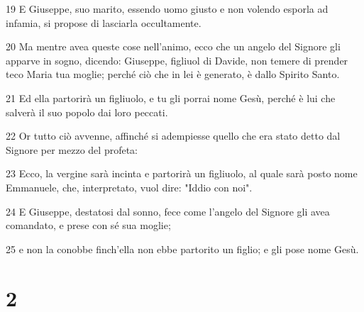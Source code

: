 \par 19 E Giuseppe, suo marito, essendo uomo giusto e non volendo esporla ad infamia, si propose di lasciarla occultamente.
\par 20 Ma mentre avea queste cose nell'animo, ecco che un angelo del Signore gli apparve in sogno, dicendo: Giuseppe, figliuol di Davide, non temere di prender teco Maria tua moglie; perché ciò che in lei è generato, è dallo Spirito Santo.
\par 21 Ed ella partorirà un figliuolo, e tu gli porrai nome Gesù, perché è lui che salverà il suo popolo dai loro peccati.
\par 22 Or tutto ciò avvenne, affinché si adempiesse quello che era stato detto dal Signore per mezzo del profeta:
\par 23 Ecco, la vergine sarà incinta e partorirà un figliuolo, al quale sarà posto nome Emmanuele, che, interpretato, vuol dire: "Iddio con noi".
\par 24 E Giuseppe, destatosi dal sonno, fece come l'angelo del Signore gli avea comandato, e prese con sé sua moglie;
\par 25 e non la conobbe finch'ella non ebbe partorito un figlio; e gli pose nome Gesù.

\chapter{2}

